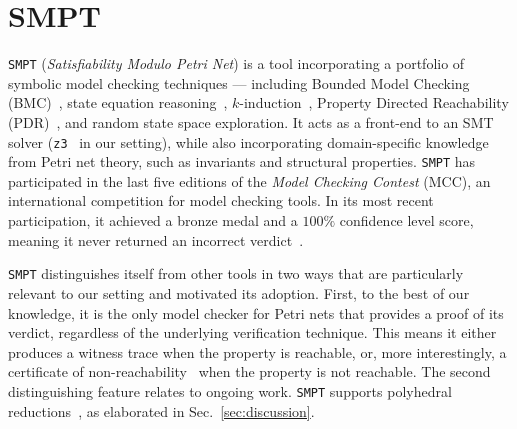 

\section{SMPT}
\label{appendix:smpt}



\texttt{SMPT} (\emph{Satisfiability Modulo Petri Net}) is a tool incorporating a portfolio of symbolic model checking techniques --- including Bounded Model Checking (BMC)~\cite{BiCiClZh99}, state equation reasoning~\cite{Mu77}, $k$-induction~\cite{ShSiSt20}, Property Directed Reachability (PDR)~\cite{Br11,AmDaHu22}, and random state space exploration. It acts as a front-end to an SMT solver (\texttt{z3}~\cite{DeBj08} in our setting), while also incorporating domain-specific knowledge from Petri net theory, such as invariants and structural properties. \texttt{SMPT} has participated in the last five editions of the \textit{Model Checking Contest} (MCC), an international competition for model checking tools. In its most recent participation, it achieved a bronze medal and a $100\%$ confidence level score, meaning it never returned an incorrect verdict~\cite{mcc:2025}.

\texttt{SMPT} distinguishes itself from other tools in two ways that are particularly relevant to our setting and motivated its adoption. First, to the best of our knowledge, it is the only model checker for Petri nets that provides a proof of its verdict, regardless of the underlying verification technique. This means it either produces a witness trace when the property is reachable, or, more interestingly, a certificate of non-reachability~\cite{AmDaHu22} when the property is not reachable.
%
The second distinguishing feature relates to ongoing work. \texttt{SMPT} supports polyhedral reductions~\cite{AmBeDa21}, as elaborated in Sec.~\ref{sec:discussion}.



